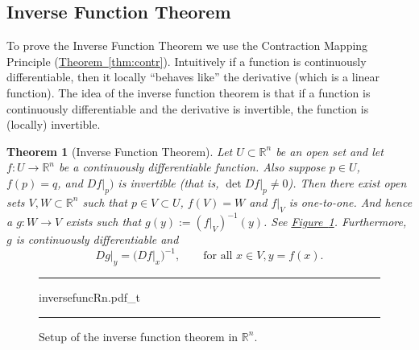 \documentclass[12pt,openany]{book}
\newcommand{\R}{{\mathbb{R}}}
\theoremstyle{plain}
\newtheorem{thm}{Theorem}[section]
\theoremstyle{remark}
\theoremstyle{definition}
\newenvironment{myfig}{%
\begin{figure}[h!t]
\noindent\rule{\textwidth}{0.4pt}\vspace{12pt}\par\centering}%
{\par\noindent\rule{\textwidth}{0.4pt}
\end{figure}}
\theoremstyle{exercise}
\theoremstyle{example}
\newcommand{\figureref}[1]{\hyperref[#1]{Figure~\ref*{#1}}}
\newcommand{\thmref}[1]{\hyperref[#1]{Theorem~\ref*{#1}}}
\begin{document}
\subsection{Inverse Function Theorem}
\label{subsec:svinvfuncthm}

To prove the Inverse Function Theorem we use the Contraction Mapping
Principle (\thmref{thm:contr}).
Intuitively if a function is continuously differentiable, then it
locally ``behaves like'' the derivative (which is a linear function).
The idea of the inverse function theorem is that if a function is
continuously differentiable and the derivative is invertible, the function is
(locally) invertible.

\begin{thm}[Inverse Function Theorem]
\label{thm:inverse}
Let $U \subset \R^n$ be an open set and let
$f \colon U \to \R^n$ be a continuously differentiable function.
Also suppose $p \in U$, $f(p) = q$, and $Df|_p)$ is invertible
(that is, $\det Df|_p \not=0$).
Then there exist open sets $V, W \subset \R^n$ such that
$p \in V \subset U$, $f(V) = W$ and $f|_V$ is one-to-one.  
And hence a $g \colon W \to V$ exists such that
$g(y) := (f|_V)^{-1}(y)$.
See \figureref{fig:inversefuncRn}.
Furthermore, $g$ is continuously differentiable
and 
\begin{equation*}
Dg|_y = {\bigl(Df|_x\bigr)}^{-1}, \qquad \text{for all } x \in V, y = f(x).
\end{equation*}
\end{thm}

\begin{myfig}
{inversefuncRn.pdf_t}
\caption{Setup of the inverse function theorem in $\R^n$.\label{fig:inversefuncRn}}
\end{myfig}
\end{document}
